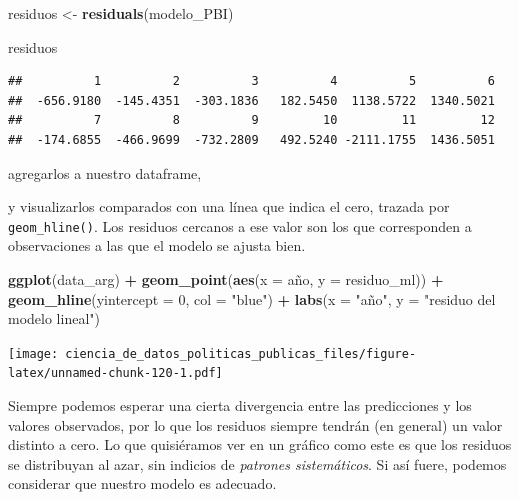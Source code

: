 \documentclass[]{book}
\newenvironment{Shaded}{\begin{snugshade}}{\end{snugshade}}
\newcommand{\KeywordTok}[1]{\textcolor[rgb]{0.13,0.29,0.53}{\textbf{#1}}}
\newcommand{\DataTypeTok}[1]{\textcolor[rgb]{0.13,0.29,0.53}{#1}}
\newcommand{\DecValTok}[1]{\textcolor[rgb]{0.00,0.00,0.81}{#1}}
\newcommand{\StringTok}[1]{\textcolor[rgb]{0.31,0.60,0.02}{#1}}
\newcommand{\OperatorTok}[1]{\textcolor[rgb]{0.81,0.36,0.00}{\textbf{#1}}}
\newcommand{\NormalTok}[1]{#1}
\begin{document}
\begin{Shaded}
\begin{Highlighting}[]
\NormalTok{residuos <-}\StringTok{ }\KeywordTok{residuals}\NormalTok{(modelo_PBI)}

\NormalTok{residuos}
\end{Highlighting}
\end{Shaded}

\begin{verbatim}
##          1          2          3          4          5          6 
##  -656.9180  -145.4351  -303.1836   182.5450  1138.5722  1340.5021 
##          7          8          9         10         11         12 
##  -174.6855  -466.9699  -732.2809   492.5240 -2111.1755  1436.5051
\end{verbatim}

agregarlos a nuestro dataframe,

\begin{Shaded}
\end{Shaded}

y visualizarlos comparados con una línea que indica el cero, trazada por
\texttt{geom\_hline()}. Los residuos cercanos a ese valor son los que
corresponden a observaciones a las que el modelo se ajusta bien.

\begin{Shaded}
\begin{Highlighting}[]
\KeywordTok{ggplot}\NormalTok{(data_arg) }\OperatorTok{+}
\StringTok{    }\KeywordTok{geom_point}\NormalTok{(}\KeywordTok{aes}\NormalTok{(}\DataTypeTok{x =}\NormalTok{ año, }\DataTypeTok{y =}\NormalTok{ residuo_ml)) }\OperatorTok{+}
\StringTok{    }\KeywordTok{geom_hline}\NormalTok{(}\DataTypeTok{yintercept =} \DecValTok{0}\NormalTok{, }\DataTypeTok{col =} \StringTok{"blue"}\NormalTok{) }\OperatorTok{+}
\StringTok{    }\KeywordTok{labs}\NormalTok{(}\DataTypeTok{x =} \StringTok{"año"}\NormalTok{, }\DataTypeTok{y =} \StringTok{"residuo del modelo lineal"}\NormalTok{)}
\end{Highlighting}
\end{Shaded}

\texttt{[image: ciencia\_de\_datos\_politicas\_publicas\_files/figure-latex/unnamed-chunk-120-1.pdf]}

Siempre podemos esperar una cierta divergencia entre las predicciones y
los valores observados, por lo que los residuos siempre tendrán (en
general) un valor distinto a cero. Lo que quisiéramos ver en un gráfico
como este es que los residuos se distribuyan al azar, sin indicios de
\emph{patrones sistemáticos}. Si así fuere, podemos considerar que
nuestro modelo es adecuado.
\end{document}
